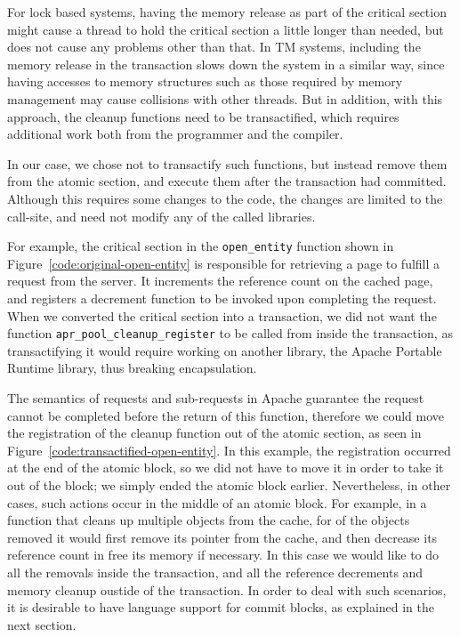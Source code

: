 \documentclass[preprint,11pt]{sigplanconf}
\begin{document}
For lock based systems, having the memory release as part of the critical
section might cause a thread to hold the critical section a little longer than
needed, but does not cause any problems other than that. In TM
systems, including the memory release in the transaction slows down
the system in a similar way, since
having accesses to memory structures such as those required by
memory management may cause collisions with other threads. But 
in addition, with this approach, the cleanup functions need to be
transactified, which requires additional work both from the programmer and the
compiler.

In our case, we chose not to transactify such functions, but instead remove them
from the atomic section, and execute them after the transaction had committed.
Although this requires some changes to the code, the changes are limited to the
call-site, and need not modify any of the called libraries.

For example, the  critical section in the {\tt open\_entity} function
shown in Figure~\ref{code:original-open-entity}
 is responsible for retrieving a page
to fulfill a request from the server. It  increments the reference count on
the cached page, and registers a decrement function to be invoked upon completing
the request. When we converted the critical section into a transaction, we
did not want the function {\tt apr\_pool\_cleanup\_register} to be called from
inside the transaction, as transactifying it would require working on another
library, the Apache Portable Runtime library, thus breaking encapsulation.

The semantics of requests and sub-requests in Apache guarantee the request
cannot be completed before the return of this function, therefore we could
move the registration of the cleanup function out of the atomic section, as 
seen in Figure~\ref{code:transactified-open-entity}. In this example, 
the registration occurred at the end of the atomic block, so 
we did not have to move it in order to take it out of the block;
we simply ended the atomic block earlier. Nevertheless, in other cases,
such actions occur in the middle of an atomic block. For example, in a function
that cleans up multiple objects from the cache, for of the objects removed it
would first remove its pointer from the cache, and then decrease its reference
count in free its memory if necessary. In this case we would like to do all the
removals inside the transaction, and all the reference decrements and memory
cleanup oustide of the transaction. In order to deal with such scenarios, it is
desirable to have language support for commit blocks, as explained in the next
section. 
\end{document}
